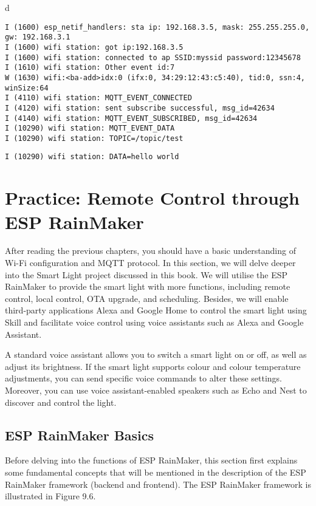 \documentclass[a4paper,12pt]{book}
\begin{document}
\begin{codebloc}
\begin{tabular}{d}
\vspace{2pt}
\fontsize{9pt}{9.5pt}\selectfont
\begin{verbatim}
I (1600) esp_netif_handlers: sta ip: 192.168.3.5, mask: 255.255.255.0, gw: 192.168.3.1
I (1600) wifi station: got ip:192.168.3.5
I (1600) wifi station: connected to ap SSID:myssid password:12345678
I (1610) wifi station: Other event id:7
W (1630) wifi:<ba-add>idx:0 (ifx:0, 34:29:12:43:c5:40), tid:0, ssn:4, winSize:64
I (4110) wifi station: MQTT_EVENT_CONNECTED
I (4120) wifi station: sent subscribe successful, msg_id=42634
I (4140) wifi station: MQTT_EVENT_SUBSCRIBED, msg_id=42634
I (10290) wifi station: MQTT_EVENT_DATA
I (10290) wifi station: TOPIC=/topic/test
\end{verbatim}
\verb|I (10290) wifi station: DATA=hello world|
\end{tabular}
\end{codebloc}

\section{Practice: Remote Control through ESP RainMaker}
After reading the previous chapters, you should have a basic understanding of Wi-Fi configuration and MQTT protocol. In this section, we will delve deeper into the Smart Light project discussed in this book. We will utilise the ESP RainMaker to provide the smart light with more functions, including remote control, local control, OTA upgrade, and scheduling. Besides, we will enable third-party applications Alexa and Google Home to control the smart light using Skill and facilitate voice control using voice assistants such as Alexa and Google Assistant.

A standard voice assistant allows you to switch a smart light on or off, as well as adjust its brightness. If the smart light supports colour and colour temperature adjustments, you can send specific voice commands to alter these settings. Moreover, you can use voice assistant-enabled speakers such as Echo and Nest to discover and control the light.

\subsection{ESP RainMaker Basics}
Before delving into the functions of ESP RainMaker, this section first explains some fundamental concepts that will be mentioned in the description of the ESP RainMaker framework (backend and frontend). The ESP RainMaker framework is illustrated in Figure 9.6.
\end{document}

